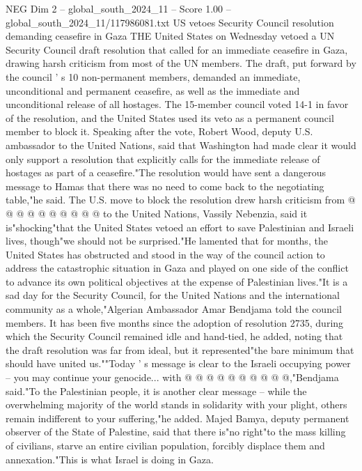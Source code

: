 \begin{textsample}{NEG Dim 2 – global\_south\_2024\_11 – Score 1.00 – global\_south\_2024\_11/117986081.txt}  \label{ex:f2_neg_269}
US vetoes Security Council resolution demanding ceasefire in Gaza THE United States on Wednesday vetoed a UN Security Council draft resolution that called for an immediate ceasefire in Gaza, drawing harsh criticism from most of the UN members.
The draft, put forward by the council ' s 10 non-permanent members, demanded an immediate, unconditional and permanent ceasefire, as well as the immediate and unconditional release of all hostages.
The 15-member council voted 14-1 in favor of the resolution, and the United States used its veto as a permanent council member to block it.
Speaking after the vote, Robert Wood, deputy U.S. ambassador to the United Nations, said that Washington had made clear it would only support a resolution that explicitly calls for the immediate release of hostages as part of a ceasefire."The resolution would have sent a dangerous message to Hamas that there was no need to come back to the negotiating table,"he said.
The U.S. move to block the resolution drew harsh criticism from @ @ @ @ @ @ @ @ @ @ to the United Nations, Vassily Nebenzia, said it is"shocking"that the United States vetoed an effort to save Palestinian and Israeli lives, though"we should not be surprised."He lamented that for months, the United States has obstructed and stood in the way of the council action to address the catastrophic situation in Gaza and played on one side of the conflict to advance its own political objectives at the expense of Palestinian lives."It is a sad day for the Security Council, for the United Nations and the international community as a whole,"Algerian Ambassador Amar Bendjama told the council members.
It has been five months since the adoption of resolution 2735, during which the Security Council remained idle and hand-tied, he added, noting that the draft resolution was far from ideal, but it represented"the bare minimum that should have united us.""Today ' s message is clear to the Israeli occupying power -- you may continue your genocide... with @ @ @ @ @ @ @ @ @ @,"Bendjama said."To the Palestinian people, it is another clear message -- while the overwhelming majority of the world stands in solidarity with your plight, others remain indifferent to your suffering,"he added.
Majed Bamya, deputy permanent observer of the State of Palestine, said that there is"no right"to the mass killing of civilians, starve an entire civilian population, forcibly displace them and annexation."This is what Israel is doing in Gaza.

\end{textsample}
